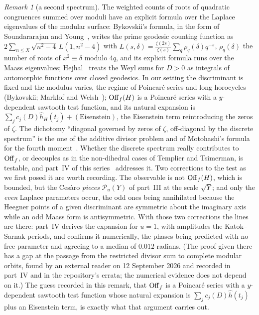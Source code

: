 \documentclass[11pt,a4paper]{article}
\theoremstyle{remark}\newtheorem{remark}[theorem]{Remark}
\begin{document}
\begin{remark}[a second spectrum]
The weighted counts of roots of quadratic congruences summed over moduli have an explicit formula over the
Laplace eigenvalues of the modular surface: Bykovskii's formula, in the form of Soundararajan and
Young~\cite[Prop.~2.2]{SoundararajanYoung2013}, writes the prime geodesic counting function as
$2\sum_{n\le X}\sqrt{n^2-4}\,L(1,n^2-4)$ with $L(s,\delta)=\frac{\zeta(2s)}{\zeta(s)}\sum_q\rho_q(\delta)q^{-s}$,
$\rho_q(\delta)$ the number of roots of $x^2\equiv\delta$ modulo $4q$, and its explicit formula runs over the
Maass eigenvalues; Hejhal~\cite{Hejhal1986} treats the Weyl sums for $D>0$ as integrals of automorphic
functions over closed geodesics. In our setting the discriminant is fixed and the modulus varies, the regime
of Poincar\'e series and long horocycles (Bykovskii; Marklof and Welsh~\cite{MarklofWelsh2023}); $\mathrm{Off}_f(H)$ is a
Poincar\'e series with a $y$-dependent sawtooth test function, and its natural expansion is
$\sum_jc_j(D)\hat h_H(t_j)+(\text{Eisenstein})$, the Eisenstein term reintroducing the zeros of $\zeta$. The
dichotomy ``diagonal governed by zeros of $\zeta$, off-diagonal by the discrete spectrum'' is the one of the
additive divisor problem and of Motohashi's formula for the fourth moment~\cite{Motohashi1993}. Whether the
discrete spectrum really contributes to $\mathrm{Off}_f$, or decouples as in the non-dihedral cases of Templier and
Tsimerman, is testable, and part~IV of this series~\cite{ReichardtIV} addresses it. Two corrections to the test as we
first posed it are worth recording. The observable is not $\mathrm{Off}_f(H)$, which is bounded, but the Ces\`aro
\emph{pieces} $\mathcal P_u(Y)$ of part~III at the scale $\sqrt Y$; and only the \emph{even} Laplace parameters
occur, the odd ones being annihilated because the Heegner points of a given discriminant are symmetric about the
imaginary axis while an odd Maass form is antisymmetric. With those two corrections the lines are there: part~IV
derives the expansion for $u=1$, with amplitudes the Katok--Sarnak periods, and confirms it numerically, the phases
being predicted with no free parameter and agreeing to a median of $0.012$ radians. (The proof given there has a gap
at the passage from the restricted divisor sum to complete modular orbits, found by an external reader on
12 September 2026 and recorded in part~IV and in the repository's errata; the numerical evidence does not depend on
it.) The guess recorded in this remark,
that $\mathrm{Off}_f$ is a Poincar\'e series with a $y$-dependent sawtooth test function whose natural expansion is
$\sum_jc_j(D)\hat h(t_j)$ plus an Eisenstein term, is exactly what that argument carries out.
\end{remark}
\end{document}
